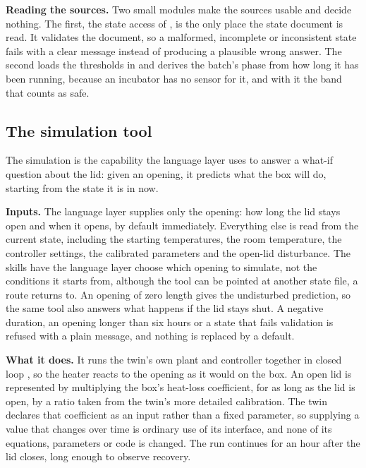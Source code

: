   \textbf{Reading the sources.} Two small modules make the sources usable and decide nothing. The
  first, the state access of , is the only place the state document is
  read. It validates the document, so a malformed, incomplete or inconsistent state fails with a
  clear message instead of producing a plausible wrong answer. The second loads the thresholds in
   and derives the batch's phase from how long it has been running, because an
  incubator has no sensor for it, and with it the band that counts as safe.

  \subsection{The simulation tool}
  \label{sec:simulation}

  The simulation is the capability the language layer uses to answer a what-if question about the
  lid: given an opening, it predicts what the box will do, starting from the state it is in now.

  \textbf{Inputs.} The language layer supplies only the opening: how long the lid stays open and
  when it opens, by default immediately. Everything else is read from the current state, including
  the starting temperatures, the room temperature, the controller settings, the calibrated
  parameters and the open-lid disturbance. The skills have the language layer choose which opening
  to simulate, not the conditions it starts from, although the tool can be pointed at another
  state file, a route  returns to. An opening of zero length gives the undisturbed prediction,
  so the same tool also answers what happens if the lid stays shut. A negative duration, an opening
  longer than six hours or a state that fails validation is refused with a plain message, and
  nothing is replaced by a default.

  \textbf{What it does.} It runs the twin's own plant and controller together in closed loop
  \cite{gomes2025incubator}, so the heater reacts to the opening as it would on the box. An open
  lid is represented by multiplying the box's heat-loss coefficient, for as long as the lid is
  open, by a ratio taken from the twin's more detailed calibration. The twin declares that
  coefficient as an input rather than a fixed parameter, so supplying a value that changes over
  time is ordinary use of its interface, and none of its equations, parameters or code is changed.
  The run continues for an hour after the lid closes, long enough to observe recovery.

